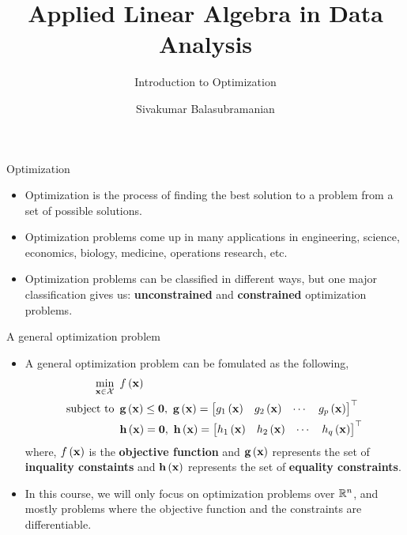 \documentclass[aspectratio=169]{beamer}
\title{Applied Linear Algebra in Data Analysis}
\subtitle{Introduction to Optimization}
\author{Sivakumar Balasubramanian}
\institute[Christian Medical College] %
{
  \inst{}%
  Department of Bioengineering\\
  Christian Medical College, Bagayam\\
  Vellore 632002
}
\date{}
\let\olditem\item
\renewcommand{\item}{\setlength{\itemsep}{\fill}\olditem}
\def\mf{\ensuremath\mathbf}
\def\mb{\ensuremath\mathbb}
\def\mc{\ensuremath\mathcal}
\def\lp{\ensuremath\left(}
\def\rp{\ensuremath\right)}
\def\bmx{\ensuremath\begin{bmatrix*}[r]}
\def\emx{\ensuremath\end{bmatrix*}}
\def\R{\ensuremath\mb{R}}
\newcommand{\ct}[1]{\lp #1\rp}
\begin{document}


\begin{frame}
  \titlepage
\end{frame}



\begin{frame}[t]{Optimization}
\begin{itemize}
  \item Optimization is the process of finding the best solution to a problem from a set of possible solutions.
  \item Optimization problems come up in many applications in engineering, science, economics, biology, medicine, operations research, etc.
  \item Optimization problems can be classified in different ways, but one major classification gives us: \textbf{unconstrained} and \textbf{constrained} optimization problems.
\end{itemize}
\end{frame}


\begin{frame}[t]{A general optimization problem}
\begin{itemize}
  \item A general optimization problem can be fomulated as the following,
  \[ \begin{split}
      \min_{\mf{x} \in \mc{X}} & \,\,\, f\ct{\mf{x}} \\
      \mathrm{subject \,\, to} & \,\,\, \mf{g}\ct{\mf{x}} \leq \mf{0}, \,\, \mf{g}\ct{\mf{x}} = \bmx g_1\ct{\mf{x}} & g_2\ct{\mf{x}} & \cdots & g_p\ct{\mf{x}}\emx^\top \\
      & \,\,\, \mf{h}\ct{\mf{x}} = \mf{0}, \,\, \mf{h}\ct{\mf{x}} = \bmx h_1\ct{\mf{x}} & h_2\ct{\mf{x}} & \cdots & h_q\ct{\mf{x}}\emx^\top \\
  \end{split} \]
  where, $f\ct{\mf{x}}$ is the \textbf{objective function} and $\mf{g}\ct{\mf{x}}$ represents the set of \textbf{inquality constaints} and $\mf{h}\ct{\mf{x}}$ represents the set of \textbf{equality constraints}.

  \item In this course, we will only focus on optimization problems over $\R^n$, and mostly problems where the objective function and the constraints are differentiable.
\end{itemize}
\end{frame}
\end{document}
